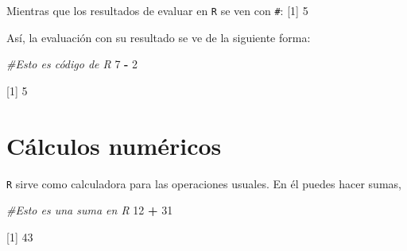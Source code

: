 \documentclass[
]{book}
\newenvironment{Shaded}{\begin{snugshade}}{\end{snugshade}}
\newcommand{\CommentTok}[1]{\textcolor[rgb]{0.56,0.35,0.01}{\textit{#1}}}
\newcommand{\DecValTok}[1]{\textcolor[rgb]{0.00,0.00,0.81}{#1}}
\newcommand{\OperatorTok}[1]{\textcolor[rgb]{0.81,0.36,0.00}{\textbf{#1}}}
\newcommand{\StringTok}[1]{\textcolor[rgb]{0.31,0.60,0.02}{#1}}
\begin{document}
Mientras que los resultados de evaluar en \texttt{R} se ven con \texttt{\#}:
{[}1{]} 5

Así, la evaluación con su resultado se ve de la siguiente forma:

\begin{Shaded}
\begin{Highlighting}[]
\CommentTok{#Esto es código de R}
\DecValTok{7} \OperatorTok{-}\StringTok{ }\DecValTok{2}
\end{Highlighting}
\end{Shaded}

{[}1{]} 5

\hypertarget{cuxe1lculos-numuxe9ricos}{%
\section{Cálculos numéricos}\label{cuxe1lculos-numuxe9ricos}}

\texttt{R} sirve como calculadora para las operaciones usuales. En él puedes hacer sumas,

\begin{Shaded}
\begin{Highlighting}[]
\CommentTok{#Esto es una suma en R}
\DecValTok{12} \OperatorTok{+}\StringTok{ }\DecValTok{31}
\end{Highlighting}
\end{Shaded}

{[}1{]} 43
\end{document}
